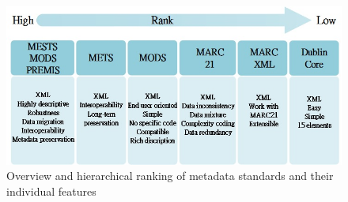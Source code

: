 \begin{figure}		
	\begin{center}
		\includegraphics[width=1.8\columnwidth]{EagleUnit_Background_Chart_1}
	\end{center}
	\caption{Overview and hierarchical ranking of metadata standards and their individual features}
\end{figure}

